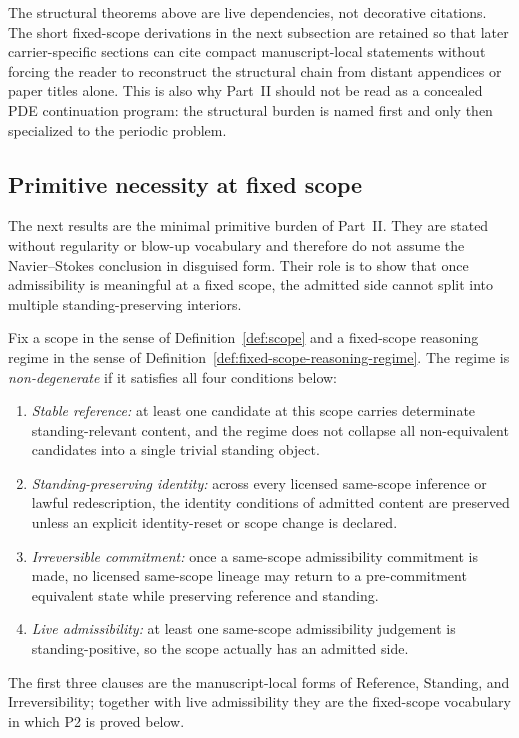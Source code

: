 \begin{remark}\label{rem:imported-packet-local-specialization}
The structural theorems above are live dependencies, not decorative citations. The short fixed-scope derivations in the next subsection are retained so that later carrier-specific sections can cite compact manuscript-local statements without forcing the reader to reconstruct the structural chain from distant appendices or paper titles alone. This is also why Part~II should not be read as a concealed PDE continuation program: the structural burden is named first and only then specialized to the periodic problem.
\end{remark}

\subsection{Primitive necessity at fixed scope}

The next results are the minimal primitive burden of Part~II. They are stated without regularity or blow-up vocabulary and therefore do not assume the Navier--Stokes conclusion in disguised form. Their role is to show that once admissibility is meaningful at a fixed scope, the admitted side cannot split into multiple standing-preserving interiors.

\begin{definition}\label{def:nondegenerate-fixed-scope}
Fix a scope in the sense of Definition~\ref{def:scope} and a fixed-scope reasoning regime in the sense of Definition~\ref{def:fixed-scope-reasoning-regime}. The regime is \emph{non-degenerate} if it satisfies all four conditions below:
\begin{enumerate}[label=(\roman*), leftmargin=2.2em]
\item \emph{Stable reference:} at least one candidate at this scope carries determinate standing-relevant content, and the regime does not collapse all non-equivalent candidates into a single trivial standing object.
\item \emph{Standing-preserving identity:} across every licensed same-scope inference or lawful redescription, the identity conditions of admitted content are preserved unless an explicit identity-reset or scope change is declared.
\item \emph{Irreversible commitment:} once a same-scope admissibility commitment is made, no licensed same-scope lineage may return to a pre-commitment equivalent state while preserving reference and standing.
\item \emph{Live admissibility:} at least one same-scope admissibility judgement is standing-positive, so the scope actually has an admitted side.
\end{enumerate}
The first three clauses are the manuscript-local forms of Reference, Standing, and Irreversibility; together with live admissibility they are the fixed-scope vocabulary in which P2 is proved below.
\end{definition}

